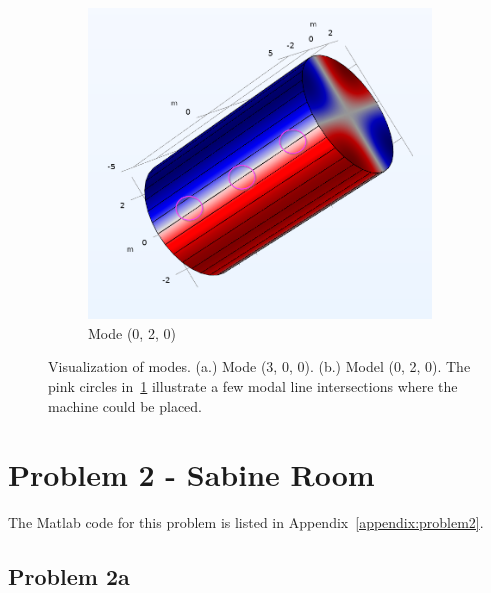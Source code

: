 {\begin{figure}[htbp]
    \vspace{0.25cm}
    \begin{subfigure}{0.5\textwidth}
        \includegraphics[width=\textwidth]{Mode Profile 55_8 Hz.png}
            \caption{Mode (0, 2, 0)}
            \label{fig:sub2}
    \end{subfigure}
    
        \vspace{0.5cm}
    \caption{Visualization of modes.  (a.) Mode (3, 0, 0).  (b.) Model (0, 2, 0).  The pink circles in~\ref{fig:sub2} illustrate a few modal line intersections where the machine could be placed.}
    \label{fig:modeVisualization}
      
\end{figure}






\newpage
\section*{Problem 2 - Sabine Room}

The Matlab code for this problem is listed in Appendix~\ref{appendix:problem2}.


\vspace{0.25cm}
\subsection*{Problem 2a}

}
